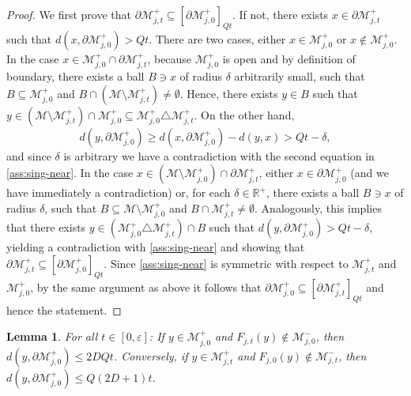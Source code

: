 \documentclass{amsart}
\numberwithin{equation}{section}
\newtheorem{lemma}[theorem]{Lemma}
\newcommand\ve{\varepsilon}
\renewcommand{\ge}{\geqslant}
\renewcommand{\le}{\leqslant}
\newcommand\cM{{\mathcal M}}
\newcommand\bR{{\mathbb R}}
\begin{document}
\begin{proof}
We first prove that \(\partial \cM_{j,t}^{+}\subseteq [\partial \cM_{j,0}^{+} ]_{Qt}\). If not, there exists \(x \in \partial \cM_{j,t}^{+}\) such that \(d(x, \partial \cM_{j,0}^{+}) > Qt\). There are two cases, either \(x \in \cM_{j,0}^{+}\) or \(x \notin \cM_{j,0}^{+}\). In the case \(x \in \cM_{j,0}^{+}\cap \partial \cM_{j,t}^{+}\), because \(\cM_{j,0}^+\) is open and by definition of boundary, there exists a ball \(B \ni x\) of radius \(\delta\) arbitrarily small, such that \(B \subseteq \cM_{j,0}^{+}\) and \(B \cap (\cM \setminus \cM_{j,t}^{+}) \neq \emptyset\). Hence, there exists \(y \in B\) such that \(y \in (\cM \setminus \cM_{j,t}^{+}) \cap \cM_{j,0}^{+} \subseteq \cM_{j,0}^{+} \triangle \cM_{j,t}^{+}\). On the other hand, 
\[
d(y, \partial \cM_{j,0}^{+}) \ge d(x, \partial \cM_{j,0}^{+} ) -d(y,x) > Qt - \delta,
\]
and since \(\delta\) is arbitrary we have a contradiction with the second equation in \ref{ass:sing-near}. In the case \(x \in (\cM \setminus\cM_{j,0}^{+})\cap \partial \cM_{j,t}^{+}\), either \(x \in \partial \cM_{j,0}^{+}\) (and we have immediately a contradiction) or, for each \(\delta \in \bR^+\), there exists a ball \(B \ni x\) of radius \(\delta\), such that \(B \subseteq \cM \setminus \cM_{j,0}^{+}\) and \(B \cap  \cM_{j,t}^{+} \neq \emptyset\). Analogously, this implies that there exists \(y \in (\cM_{j,0}^{+} \triangle \cM_{j,t}^{+} )\cap B\) such that \(d(y, \partial \cM_{j,0}^{+}) > Qt - \delta\), yielding a contradiction with \ref{ass:sing-near} and showing that \(\partial \cM_{j,t}^{+}\subseteq [\partial \cM_{j,0}^{+} ]_{Qt}\). Since \ref{ass:sing-near} is symmetric with respect to \(\cM_{j,t}^{+}\) and \(\cM_{j,0}^{+}\), by the same argument as above it follows that  \(\partial \cM_{j,0}^{+}\subseteq [\partial \cM_{j,t}^{+} ]_{Qt}\) and hence the statement.
\end{proof}
\begin{lemma}\label{lem:aux-sing}
For all \(t \in [0,\ve]\): If \(y \in \cM_{j,0}^{+}\) and \(F_{j,t}(y) \notin \cM_{j,0}^{-}\), then \(d \left(y, \partial \cM_{j,0}^{+}\right) \le 2 D Q t\). Conversely, if \(y \in \cM_{j,t}^{+}\) and \(F_{j,0}(y) \notin \cM_{j,t}^{-}\), then \(d \left(y, \partial \cM_{j,0}^{+}\right) \le  Q(2D+1) t\).
\end{lemma}
\end{document}
